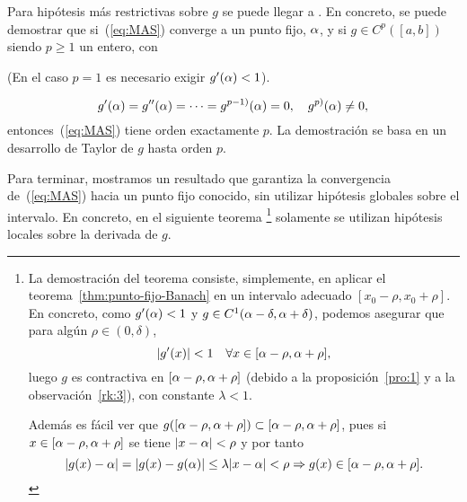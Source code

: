 \begin{remark}
  Para hipótesis más restrictivas sobre $g$ se puede llegar a
  . En concreto, se puede demostrar
  que si~(\ref{eq:MAS}) converge a un punto fijo, $\alpha$, y si
  $g\in C^p([a,b])$ siendo $p \ge 1$ un entero, con
  \begin{extension}
    (En el caso $p=1$ es necesario exigir $g'(\alpha)<1$).
  \end{extension}
  \begin{equation*}
    g'(\alpha)=g''(\alpha)=\cdots=g^{p-1)}(\alpha)=0, \quad
    g^{p)}(\alpha)\neq 0,
  \end{equation*}
  entonces~(\ref{eq:MAS}) tiene orden exactamente $p$.
  La demostración se basa en un desarrollo de Taylor de $g$ hasta
  orden $p$.
  \label{rk:MAS.orden.p}
\end{remark}
Para terminar, mostramos un resultado que garantiza la convergencia
de~(\ref{eq:MAS}) hacia un punto fijo conocido, sin utilizar hipótesis
globales sobre el intervalo. En concreto, en el siguiente teorema%
\footnote{La demostración del teorema consiste, simplemente, en
  aplicar el teorema~\ref{thm:punto-fijo-Banach} en un intervalo
  adecuado $[x_0-\rho,x_0+\rho]$. En concreto, como $g'(\alpha)<1$ y
  $g \in C^1(\alpha-\delta,\alpha+\delta)$, podemos asegurar que para
  algún $\rho\in(0,\delta)$,
  $$
  |g'(x)|<1 \quad \forall x\in [\alpha-\rho, \alpha+\rho],
  $$
  luego $g$ es contractiva en $[\alpha-\rho, \alpha+\rho]$ (debido a
  la proposición~\ref{pro:1} y a la observación~\ref{rk:3}), con
  constante $\lambda<1$.

  Además es fácil ver que $g([\alpha-\rho, \alpha+\rho]) \subset
  [\alpha-\rho, \alpha+\rho]$, pues si $x\in[\alpha-\rho, \alpha+\rho]$
  se tiene $ |x-\alpha|<\rho$ y por tanto
  $$
  |g(x)-\alpha| = |g(x)-g(\alpha)| \le \lambda |x-\alpha|< \rho
  \Rightarrow g(x)\in [\alpha-\rho, \alpha+\rho].
  $$
}
solamente se utilizan hipótesis locales sobre la derivada de $g$.

